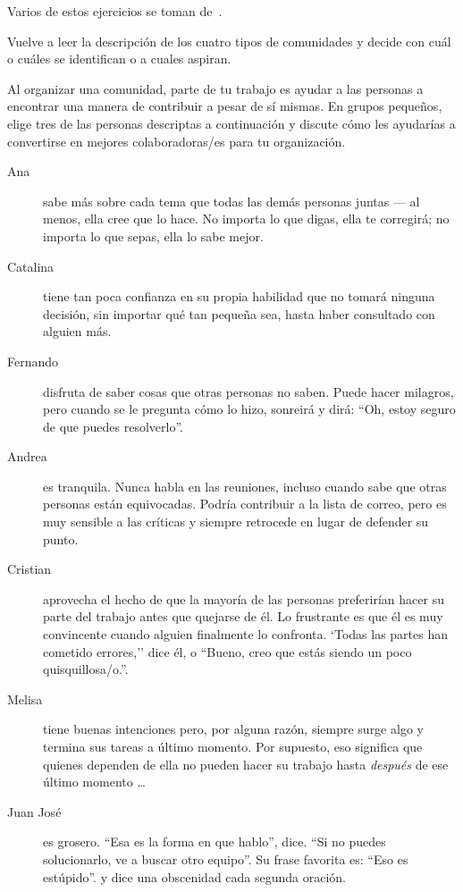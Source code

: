 
Varios de estos ejercicios se toman de~\cite{Brow2007}.


Vuelve a leer la descripción de los cuatro tipos de comunidades
y decide con cuál o cuáles se identifican o a cuales aspiran.


Al organizar una comunidad,
parte de tu trabajo es ayudar a las personas a encontrar una manera de contribuir a pesar de sí mismas.
En grupos pequeños,
elige tres de las personas descriptas a continuación
y discute cómo les ayudarías a convertirse en mejores colaboradoras/es para tu organización.

\begin{description}

\item[Ana]
  sabe más sobre cada tema que todas las demás personas juntas --- al menos,
  ella cree que lo hace.
  No importa lo que digas,
  ella te corregirá;
  no importa lo que sepas, ella lo sabe mejor.
    
\item[Catalina]
  tiene tan poca confianza en su propia habilidad
  que no tomará ninguna decisión,
  sin importar qué tan pequeña sea,
  hasta haber consultado con alguien más.

\item[Fernando]
  disfruta de saber cosas que otras personas no saben.
  Puede hacer milagros,
  pero cuando se le pregunta cómo lo hizo,
  sonreirá y dirá:
  ``Oh, estoy seguro de que puedes resolverlo''.

\item[Andrea]
  es tranquila.
  Nunca habla en las reuniones,
  incluso cuando sabe que otras personas están equivocadas.
  Podría contribuir a la lista de correo,
  pero es muy sensible a las críticas
  y siempre retrocede en lugar de defender su punto.

\item[Cristian]
  aprovecha el hecho de que la mayoría de las personas preferirían hacer su parte del trabajo antes 
  que quejarse de él.
  Lo frustrante es que él es muy convincente cuando alguien finalmente lo confronta.
  `Todas las partes han cometido errores,''
  dice él,
  o ``Bueno, creo que estás siendo un poco quisquillosa/o.''.

\item[Melisa]
  tiene buenas intenciones
  pero, por alguna razón, siempre surge algo
  y termina sus tareas a último momento.
  Por supuesto,
  eso significa que quienes dependen de ella no pueden hacer su trabajo
  hasta \emph{después} de ese último momento {\ldots}
 
\item[Juan José]
 es grosero.
  ``Esa es la forma en que hablo'', dice.
  ``Si no puedes solucionarlo, ve a buscar otro equipo''.
  Su frase favorita es: ``Eso es estúpido''.
  y dice una obscenidad cada segunda oración.

\end{description}

